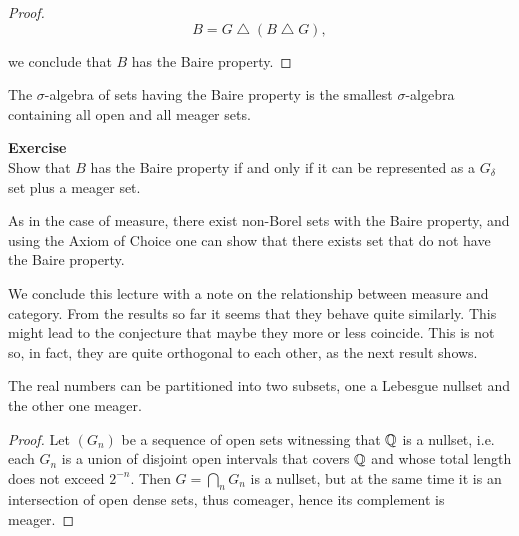 \begin{proof}
\begin{equation}
B = G \bigtriangleup (B \bigtriangleup G),
\end{equation}

we conclude that $B$ has the Baire property.

\end{proof}\begin{corollary}\label{cor-bp-algebra-small}The $\sigma$-algebra of sets having the Baire property is the smallest $\sigma$-algebra containing all open and all meager sets.

\end{corollary}\begin{framed}
\textbf{Exercise}\\
Show that $B$ has the Baire property if and only if it can be represented as a $G_\delta$ set plus a meager set.
\end{framed}

As in the case of measure, there exist non-Borel sets with the Baire property, and using the Axiom of Choice one can show that there exists set that do not have the Baire property.

We conclude this lecture with a note on the relationship between measure and category. From the results so far it seems that they behave quite similarly. This might lead to the conjecture that maybe they more or less coincide. This is not so, in fact, they are quite orthogonal to each other, as the next result shows.

\begin{proposition}The real numbers can be partitioned into two subsets, one a Lebesgue nullset and the other one meager.

\end{proposition}\begin{proof}Let $(G_n)$  be a sequence of open sets witnessing that $\mathbb{Q}$ is a nullset, i.e. each $G_n$ is a union of disjoint open intervals that covers $\mathbb{Q}$ and whose total length does not exceed $2^{ -n}$. Then $G = \bigcap_n G_n$ is a nullset, but at the same time it is an intersection of open dense sets, thus comeager, hence its complement is meager.

\end{proof}